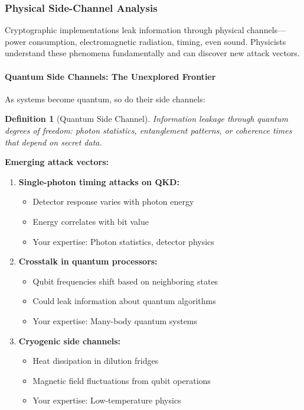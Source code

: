\documentclass[11pt,a4paper]{article}
\newtheorem{definition}{Definition}
\begin{document}
\subsubsection{Physical Side-Channel Analysis}

Cryptographic implementations leak information through physical channels—power consumption, electromagnetic radiation, timing, even sound. Physicists understand these phenomena fundamentally and can discover new attack vectors.

\paragraph{Quantum Side Channels: The Unexplored Frontier}

As systems become quantum, so do their side channels:

\begin{definition}[Quantum Side Channel]
Information leakage through quantum degrees of freedom: photon statistics, entanglement patterns, or coherence times that depend on secret data.
\end{definition}

\textbf{Emerging attack vectors:}

\begin{enumerate}
    \item \textbf{Single-photon timing attacks on QKD:}
    \begin{itemize}
        \item Detector response varies with photon energy
        \item Energy correlates with bit value
        \item Your expertise: Photon statistics, detector physics
    \end{itemize}
    
    \item \textbf{Crosstalk in quantum processors:}
    \begin{itemize}
        \item Qubit frequencies shift based on neighboring states
        \item Could leak information about quantum algorithms
        \item Your expertise: Many-body quantum systems
    \end{itemize}
    
    \item \textbf{Cryogenic side channels:}
    \begin{itemize}
        \item Heat dissipation in dilution fridges
        \item Magnetic field fluctuations from qubit operations
        \item Your expertise: Low-temperature physics
    \end{itemize}
\end{enumerate}
\end{document}
